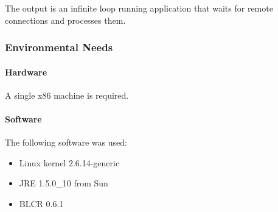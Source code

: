 The output is an infinite loop running application that waits for remote connections and processes them.

\subsubsection{Environmental Needs}

\paragraph{Hardware}

A single x86 machine is required.

\paragraph{Software}
The following software was used:
\begin{itemize}
\item Linux kernel 2.6.14-generic
\item JRE 1.5.0\_10 from Sun
\item BLCR 0.6.1 
\end{itemize}
